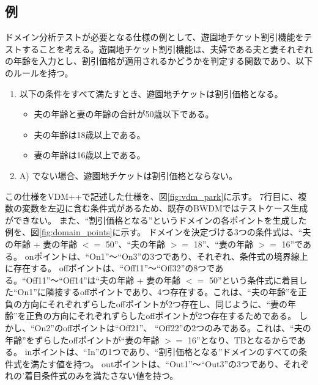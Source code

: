 \documentclass[uplatex, report, a4j, 10pt]{jsbook}
\begin{document}
\subsection{例}
ドメイン分析テストが必要となる仕様の例として、遊園地チケット割引機能をテストすることを考える。遊園地チケット割引機能は、夫婦である夫と妻それぞれの年齢を入力とし、割引価格が適用されるかどうかを判定する関数であり、以下のルールを持つ。
\begin{enumerate}
  \renewcommand{\labelenumi}{\Alph{enumi})}
  \item\label{enu:yuenchi} 以下の条件をすべて満たすとき、遊園地チケットは割引価格となる。
        \begin{itemize}
          \item 夫の年齢と妻の年齢の合計が50歳以下である。
          \item 夫の年齢は18歳以上である。
          \item 妻の年齢は16歳以上である。
        \end{itemize}
  \item A) でない場合、遊園地チケットは割引価格とならない。
\end{enumerate}
この仕様をVDM++で記述した仕様を、図\ref{fig:vdm_park}に示す。
7行目に、複数の変数を左辺に含む条件式があるため、既存のBWDMではテストケース生成ができない。
また、“割引価格となる”というドメインの各ポイントを生成した例を、図\ref{fig:domain_points}に示す。
ドメインを決定づける3つの条件式は、“夫の年齢 + 妻の年齢 $<=$ 50”、“夫の年齢 $>=$ 18”、“妻の年齢 $>=$ 16”である。
onポイントは、“On1”〜“On3”の3つであり、それぞれ、条件式の境界線上に存在する。
offポイントは、“Off11”〜“Off32”の8つである。“Off11”〜“Off14”は“夫の年齢 + 妻の年齢 $<=$ 50”という条件式に着目した“On1”に隣接するoffポイントであり、4つ存在する。これは、“夫の年齢”を正負の方向にそれぞれずらしたoffポイントが2つ存在し、同じように、“妻の年齢”を正負の方向にそれぞれずらしたoffポイントが2つ存在するためである。
しかし、“On2”のoffポイントは“Off21”、 “Off22”の2つのみである。これは、“夫の年齢”をずらしたoffポイントが“妻の年齢 $>=$ 16”となり、TBとなるからである。
inポイントは、“In”の1つであり、“割引価格となる”ドメインのすべての条件式を満たす値を持つ。
outポイントは、“Out1”〜“Out3”の3つであり、それぞれの’着目条件式のみを満たさない値を持つ。
\end{document}
